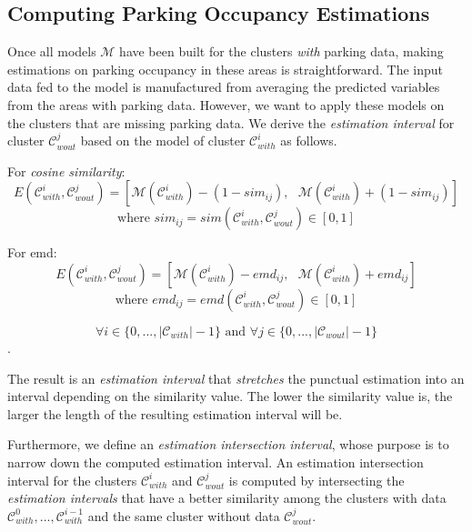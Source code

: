 	\subsection{Computing Parking Occupancy Estimations}
	Once all models $\mathcal{M}$ have been built for the clusters \textit{with} parking data, making estimations on parking occupancy in these areas is straightforward. The input data fed to the model is manufactured from averaging the predicted variables from the areas with parking data. However, we want to apply these models on the clusters that are missing parking data. We derive the \textit{estimation interval} for cluster $\mathcal{C}_{wout}^j$ based on the model of cluster $\mathcal{C}_{with}^i$ as follows.
	
	For \textit{cosine similarity}:
	\begin{equation}
	E(\mathcal{C}_{with}^i,\mathcal{C}_{wout}^j) = [\mathcal{M}(\mathcal{C}_{with}^i) - (1 - sim_{ij}), \text{    } \mathcal{M}(\mathcal{C}_{with}^i) + (1 - sim_{ij})]
	\end{equation}
	$$\text{where } sim_{ij} = sim(\mathcal{C}_{with}^i,\mathcal{C}_{wout}^j) \in [0,1]$$
	
	For emd:
	\begin{equation}
	E(\mathcal{C}_{with}^i,\mathcal{C}_{wout}^j) = [\mathcal{M}(\mathcal{C}_{with}^i) - emd_{ij},   \text{    }\mathcal{M}(\mathcal{C}_{with}^i) + emd_{ij}]
	\end{equation}
	$$\text{where } emd_{ij} = emd(\mathcal{C}_{with}^i,\mathcal{C}_{wout}^j) \in [0,1]$$
	
	$$\forall i \in \{0,...,|\mathcal{C}_{with}|-1\} \text{ and } \forall j \in \{0,...,|\mathcal{C}_{wout}|-1\}$$.
	
	The result is an \textit{estimation interval} that \textit{stretches} the punctual estimation into an interval depending on the similarity value. The lower the similarity value is, the larger the length of the resulting estimation interval will be.
	
	
	Furthermore, we define an \textit{estimation intersection interval}, whose purpose is to narrow down the computed estimation interval.
	An estimation intersection interval for the clusters $\mathcal{C}_{with}^i$ and $\mathcal{C}_{wout}^j$ is computed by intersecting the \textit{estimation intervals} that have a better similarity among the clusters with data $\mathcal{C}_{with}^{0}, ..., \mathcal{C}_{with}^{i-1}$ and the same cluster without data $\mathcal{C}_{wout}^j$.
	
